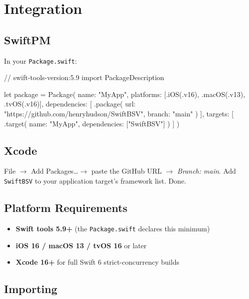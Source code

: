 \documentclass[a4paper, 11pt, openany]{book}
\begin{document}
\chapter{Integration}

\section{SwiftPM}

In your \texttt{Package.swift}:

\begin{forthbox}
// swift-tools-version:5.9
import PackageDescription

let package = Package(
    name: "MyApp",
    platforms: [.iOS(.v16), .macOS(.v13), .tvOS(.v16)],
    dependencies: [
        .package(
            url: "https://github.com/henryhudson/SwiftBSV",
            branch: "main"
        )
    ],
    targets: [
        .target(
            name: "MyApp",
            dependencies: ["SwiftBSV"]
        )
    ]
)
\end{forthbox}

\section{Xcode}

File $\rightarrow$ Add Packages\ldots $\rightarrow$ paste the GitHub URL $\rightarrow$ \emph{Branch: main}. Add \texttt{SwiftBSV} to your application target's framework list. Done.

\section{Platform Requirements}

\begin{itemize}
\item \textbf{Swift tools 5.9+} (the \texttt{Package.swift} declares this minimum)
\item \textbf{iOS 16 / macOS 13 / tvOS 16} or later
\item \textbf{Xcode 16+} for full Swift 6 strict-concurrency builds
\end{itemize}

\section{Importing}
\end{document}
